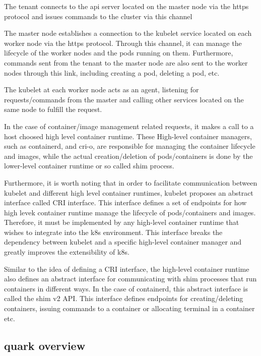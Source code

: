     The tenant connects to the api server located on the master node via the https protocol and issues commands to the cluster via this channel
    
    The master node establishes a connection to the kubelet service located on each worker node via the https protocol. Through this channel, it can manage the lifecycle of the worker nodes and the pods running on them. Furthermore, commands sent from the tenant to the master node 
    are also sent to the worker nodes through this link, including creating a pod, deleting a pod, etc.
    
    The kubelet at each worker node acts as an agent, listening for requests/commands from the master and calling other services located on the same node to fulfill the request.
    
    In the case of container/image management related requests, it makes a call to a host choosed high level container runtime.
    These High-level container managers, such as containerd, and cri-o, are responsible for managing the container lifecycle and images, while the actual creation/deletion of pods/containers is done by the lower-level container runtime or so called shim process.

    Furthermore, it is worth noting that in order to facilitate communication between kubelet and different high level container runtimes, kubelet proposes an abstract interface called CRI interface. This interface defines a set 
    of endpoints for how high levek container runtime manage the lifecycle of pods/containers and images. Therefore, it must be implemented by any high-level container runtime that wishes to integrate into the k8s environment. This interface breaks the dependency between kubelet 
    and a specific high-level container manager and greatly improves the extensibility of k8s.
    
    Similar to the idea of defining a CRI interface, the high-level container runtime also defines an abstract interface for communicating with shim processes that run containers in different ways. In the case of containerd, this abstract interface is called the shim v2 API. 
    This interface defines endpoints for creating/deleting containers, issuing commands to a container or allocating terminal in a container etc.


\subsection{quark overview}


